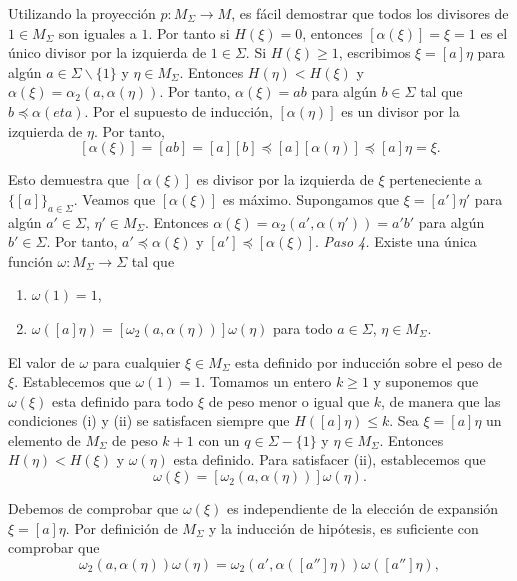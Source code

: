 \documentclass[12pt]{article}
\theoremstyle{definition}
\begin{document}
Utilizando la proyección $p:M_\Sigma\rightarrow M$, es fácil demostrar que todos los divisores de $1\in M_\Sigma$ son iguales a $1$. Por tanto si $H(\xi)=0$, entonces $[\alpha(\xi)]=\xi=1$ es el único divisor por la izquierda de $1\in\Sigma$. Si $H(\xi)\geq 1$, escribimos $\xi=[a]\eta$ para algún $a\in\Sigma \backslash \{1\}$ y $\eta\in M_\Sigma$. Entonces $H(\eta)< H(\xi)$ y $\alpha(\xi)=\alpha_2(a,\alpha(\eta))$. Por tanto, $\alpha(\xi)=ab$ para algún $b\in\Sigma$ tal que $b\preceq \alpha(eta)$. Por el supuesto de inducción, $[\alpha(\eta)]$ es un divisor por la izquierda de $\eta$. Por tanto,
$$[\alpha(\xi)]=[ab]=[a][b]\preceq [a][\alpha(\eta)]\preceq [a]\eta=\xi.$$

Esto demuestra que $[\alpha(\xi)]$ es divisor por la izquierda  de $\xi$ perteneciente a $\{[a]\}_{a\in\Sigma}$. Veamos que $[\alpha(\xi)]$ es máximo. Supongamos que $\xi=[a']\eta'$
para algún $a'\in\Sigma$, $\eta'\in M_\Sigma$. Entonces $\alpha(\xi) =\alpha_2(a',\alpha(\eta'))=a'b'$ para algún $b'\in\Sigma$. Por tanto, $a'\preceq \alpha(\xi)$ y $[a']\preceq [\alpha(\xi)]$.
\newline
\newline
\textit{Paso 4.} Existe una única función $\omega:M_\Sigma\rightarrow\Sigma$ tal que

\begin{enumerate}[label=\roman*.]
\item $\omega(1)=1$,
\item $\omega([a]\eta)=[\omega_2(a,\alpha(\eta))]\omega(\eta)$ para todo $a\in\Sigma$, $\eta\in M_\Sigma$.
\end{enumerate}

El valor de $\omega$ para cualquier $\xi\in M_\Sigma$ esta definido por inducción sobre el peso de $\xi$. Establecemos que $\omega(1)=1$. Tomamos un entero $k\geq 1$ y suponemos que $\omega(\xi)$ esta definido para todo $\xi$ de peso menor o igual que $k$, de manera que las condiciones (i) y (ii) se satisfacen siempre que $H([a]\eta)\leq k$. Sea $\xi=[a]\eta$ un elemento de $M_\Sigma$ de peso $k+1$ con un $q\in\Sigma - \{1\}$ y $\eta\in M_\Sigma$. Entonces $H(\eta)< H(\xi)$ y $\omega(\eta)$ esta definido. Para satisfacer (ii), establecemos que 
$$\omega(\xi)=[\omega_2(a,\alpha(\eta))]\omega(\eta).$$

Debemos de comprobar que $\omega(\xi)$ es independiente de la elección de expansión $\xi=[a]\eta$. Por definición de $M_\Sigma$ y la inducción de hipótesis, es suficiente con comprobar que
$$\omega_2(a,\alpha(\eta))\omega(\eta)=\omega_2(a',\alpha([a'']\eta))\omega([a'']\eta),$$
\end{document}
